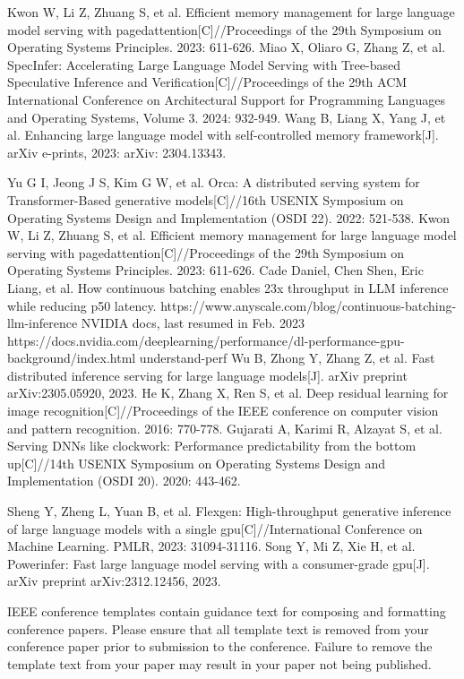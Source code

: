 \documentclass[conference]{IEEEtran}
\begin{document}
\begin{thebibliography}{00}
     Kwon W, Li Z, Zhuang S, et al. Efficient memory management for large language model serving with pagedattention[C]//Proceedings of the 29th Symposium on Operating Systems Principles. 2023: 611-626.
     Miao X, Oliaro G, Zhang Z, et al. SpecInfer: Accelerating Large Language Model Serving with Tree-based Speculative Inference and Verification[C]//Proceedings of the 29th ACM International Conference on Architectural Support for Programming Languages and Operating Systems, Volume 3. 2024: 932-949.
     Wang B, Liang X, Yang J, et al. Enhancing large language model with self-controlled memory framework[J]. arXiv e-prints, 2023: arXiv: 2304.13343.

     Yu G I, Jeong J S, Kim G W, et al. Orca: A distributed serving system for Transformer-Based generative models[C]//16th USENIX Symposium on Operating Systems Design and Implementation (OSDI 22). 2022: 521-538.
     Kwon W, Li Z, Zhuang S, et al. Efficient memory management for large language model serving with pagedattention[C]//Proceedings of the 29th Symposium on Operating Systems Principles. 2023: 611-626.
     Cade Daniel, Chen Shen, Eric Liang, et al.  How continuous batching enables 23x throughput in LLM inference while reducing p50 latency. https://www.anyscale.com/blog/continuous-batching-llm-inference
     NVIDIA docs, last resumed in Feb. 2023 https://docs.nvidia.com/deeplearning/performance/dl-performance-gpu-background/index.html understand-perf
     Wu B, Zhong Y, Zhang Z, et al. Fast distributed inference serving for large language models[J]. arXiv preprint arXiv:2305.05920, 2023.
     He K, Zhang X, Ren S, et al. Deep residual learning for image recognition[C]//Proceedings of the IEEE conference on computer vision and pattern recognition. 2016: 770-778.
     Gujarati A, Karimi R, Alzayat S, et al. Serving DNNs like clockwork: Performance predictability from the bottom up[C]//14th USENIX Symposium on Operating Systems Design and Implementation (OSDI 20). 2020: 443-462.

    Sheng Y, Zheng L, Yuan B, et al. Flexgen: High-throughput generative inference of large language models with a single gpu[C]//International Conference on Machine Learning. PMLR, 2023: 31094-31116.
    Song Y, Mi Z, Xie H, et al. Powerinfer: Fast large language model serving with a consumer-grade gpu[J]. arXiv preprint arXiv:2312.12456, 2023.
\end{thebibliography}
\vspace{12pt}
\color{red}
IEEE conference templates contain guidance text for composing and formatting conference papers. Please ensure that all template text is removed from your conference paper prior to submission to the conference. Failure to remove the template text from your paper may result in your paper not being published.
\end{document}
